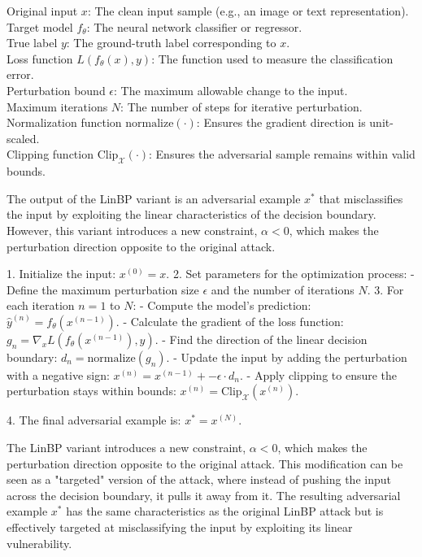 Original input $x$: The clean input sample (e.g., an image or text representation). \\
Target model $f_{\theta}$: The neural network classifier or regressor. \\
True label $y$: The ground-truth label corresponding to $x$. \\
Loss function $L(f_{\theta}(x), y)$: The function used to measure the classification error. \\
Perturbation bound $\epsilon$: The maximum allowable change to the input. \\
Maximum iterations $N$: The number of steps for iterative perturbation. \\
Normalization function $\text{normalize}(\cdot)$: Ensures the gradient direction is unit-scaled. \\
Clipping function $\text{Clip}_{\mathcal{X}}(\cdot)$: Ensures the adversarial sample remains within valid bounds.


The output of the LinBP variant is an adversarial example $x^*$ that misclassifies the input by exploiting the linear characteristics of the decision boundary. However, this variant introduces a new constraint, $\alpha < 0$, which makes the perturbation direction opposite to the original attack.


1. Initialize the input:
$
x^{(0)} = x.
$
2. Set parameters for the optimization process:
- Define the maximum perturbation size $ \epsilon $ and the number of iterations $ N $.
3. For each iteration $ n = 1 $ to $ N $:
- Compute the model's prediction:
$
\hat{y}^{(n)} = f_{\theta}(x^{(n-1)}).
$
- Calculate the gradient of the loss function:
$
g_n = \nabla_x L(f_{\theta}(x^{(n-1)}), y).
$
- Find the direction of the linear decision boundary:
$
d_n = \text{normalize}(g_n).
$
- Update the input by adding the perturbation with a negative sign:
$
x^{(n)} = x^{(n-1)} + -\epsilon \cdot d_n.
$
- Apply clipping to ensure the perturbation stays within bounds:
$
x^{(n)} = \text{Clip}_{\mathcal{X}}(x^{(n)}).
$

4. The final adversarial example is:
$
x^* = x^{(N)}.
$

The LinBP variant introduces a new constraint, $\alpha < 0$, which makes the perturbation direction opposite to the original attack. This modification can be seen as a "targeted" version of the attack, where instead of pushing the input across the decision boundary, it pulls it away from it. The resulting adversarial example $x^*$ has the same characteristics as the original LinBP attack but is effectively targeted at misclassifying the input by exploiting its linear vulnerability.